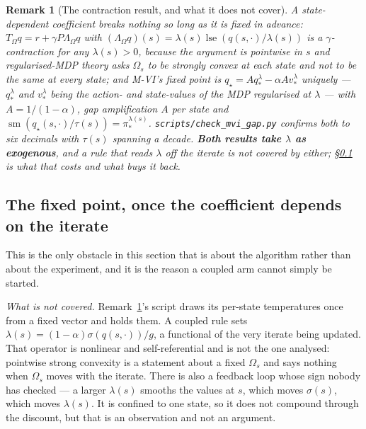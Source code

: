 \documentclass{article}
\DeclareMathOperator{\sm}{sm}
\DeclareMathOperator{\lse}{lse}
\newcommand{\srank}{\sigma}
\newtheorem{remark}{Remark}
\begin{document}
\begin{remark}[The contraction result, and what it does not cover]
\label{rem:coupled-ok}
A state-dependent coefficient breaks nothing so long as it is fixed in advance:
$T_\Omega q = r + \gamma P \Lambda_\Omega q$ with $(\Lambda_\Omega q)(s) = \lambda(s)\lse(q(s,\cdot)
/\lambda(s))$ is a $\gamma$-contraction for any $\lambda(s) > 0$, because the argument is pointwise
in $s$ and regularised-MDP theory asks $\Omega_s$ to be strongly convex at each state and not to
be the same at every state; and M-VI's fixed point is
$q_\star = A q_*^{\lambda} - \alpha A v_*^{\lambda}$ uniquely --- $q_*^{\lambda}$ and
$v_*^{\lambda}$ being the action- and state-values of the MDP regularised at $\lambda$ ---
with $A = 1/(1-\alpha)$, gap amplification $A$ per state and
$\sm(q_\star(s,\cdot)/\tau(s)) = \pi_*^{\lambda(s)}$.
\texttt{scripts/check\_mvi\_gap.py} confirms both to six decimals with $\tau(s)$ spanning a decade.
\textbf{Both results take $\lambda$ as exogenous}, and a rule that reads $\lambda$ off the
iterate is not covered by either; \S\ref{sec:couple-fixedpoint} is what that costs and what buys
it back.
\end{remark}

\subsection{The fixed point, once the coefficient depends on the iterate}
\label{sec:couple-fixedpoint}

This is the only obstacle in this section that is about the algorithm rather than about the
experiment, and it is the reason a coupled arm cannot simply be started.

\emph{What is not covered.} Remark~\ref{rem:coupled-ok}'s script draws its per-state temperatures
once from a fixed vector and holds them. A coupled rule sets
$\lambda(s) = (1-\alpha)\srank(q(s,\cdot))/g$, a functional of the very iterate being updated.
That operator is nonlinear and self-referential and is not the one analysed: pointwise strong
convexity is a statement about a fixed $\Omega_s$ and says nothing when $\Omega_s$ moves with the
iterate. There is also a feedback loop whose sign nobody has checked --- a larger $\lambda(s)$
smooths the values at $s$, which moves $\srank(s)$, which moves $\lambda(s)$. It is confined to
one state, so it does not compound through the discount, but that is an observation and not an
argument.
\end{document}
